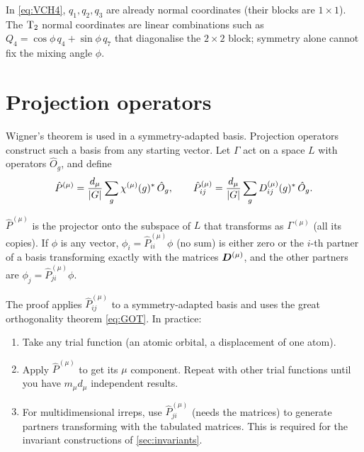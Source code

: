 \begin{remark}
In \eqref{eq:VCH4}, $q_1,q_2,q_3$ are already normal coordinates (their blocks are
$1\times1$). The $\mathrm{T}_2$ normal coordinates are linear combinations such as
$Q_4=\cos\phi\,q_4+\sin\phi\,q_7$ that diagonalise the $2\times2$ block; symmetry
alone cannot fix the mixing angle $\phi$.
\end{remark}

\section{Projection operators\beyondmark}\label{sec:projectors}

Wigner's theorem is used in a symmetry-adapted basis. Projection operators construct
such a basis from any starting vector. Let $\Gamma$ act on a space $L$ with operators
$\hat{O}_g$, and define
\begin{equation}\label{eq:projector}
\hat{P}^{(\mu)}=\frac{d_\mu}{\lvert G\rvert}\sum_g\chi^{(\mu)}(g)^{*}\,\hat{O}_g,\qquad
\hat{P}^{(\mu)}_{ij}=\frac{d_\mu}{\lvert G\rvert}\sum_gD^{(\mu)}_{ij}(g)^{*}\,\hat{O}_g .
\end{equation}
\begin{theorem}
$\hat{P}^{(\mu)}$ is the projector onto the subspace of $L$ that transforms as
$\Gamma^{(\mu)}$ (all its copies). If $\phi$ is any vector, $\phi_i=\hat{P}^{(\mu)}_{ii}\phi$
(no sum) is either zero or the $i$-th partner of a basis transforming exactly with the
matrices $\bm{D}^{(\mu)}$, and the other partners are $\phi_j=\hat{P}^{(\mu)}_{ji}\phi$.
\end{theorem}
The proof applies $\hat{P}^{(\mu)}_{ij}$ to a symmetry-adapted basis and uses the great
orthogonality theorem \eqref{eq:GOT}. In practice:
\begin{enumerate}
\item Take any trial function (an atomic orbital, a displacement of one atom).
\item Apply $\hat{P}^{(\mu)}$ to get its $\mu$ component. Repeat with other trial
      functions until you have $m_\mu d_\mu$ independent results.
\item For multidimensional irreps, use $\hat{P}^{(\mu)}_{ji}$ (needs the matrices) to
      generate partners transforming with the tabulated matrices. This is required for
      the invariant constructions of \cref{sec:invariants}.
\end{enumerate}

